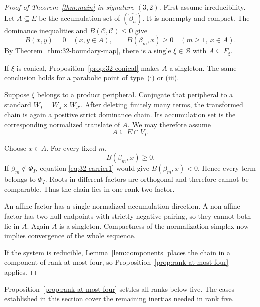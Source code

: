 \documentclass[11pt,reqno]{amsart}
\theoremstyle{plain}
\theoremstyle{definition}
\theoremstyle{remark}
\numberwithin{equation}{section}
\begin{document}
\begin{proof}[Proof of Theorem~\ref{thm:main} in signature $(3,2)$]
First assume irreducibility.
Let $A\subseteq E$ be the accumulation set of
$(\widehat{\beta_n})$.
It is nonempty and compact.
The dominance inequalities and
$B(\mathcal C,\mathcal C)\leq0$ give
\[
    B(x,y)=0\quad(x,y\in A),
    \qquad
    B(\beta_m,x)\geq0\quad(m\geq1,\ x\in A).
\]
By Theorem~\ref{thm:32-boundary-map},
there is a single $\xi\in\mathcal B$ with
$A\subseteq F_\xi$.

If $\xi$ is conical,
Proposition~\ref{prop:32-conical} makes $A$ a singleton.
The same conclusion holds for a parabolic point of
type~\textup{(i)} or \textup{(iii)}.

Suppose $\xi$ belongs to a product peripheral.
Conjugate that peripheral to a standard
$W_I=W_J\times W_{J'}$.
After deleting finitely many terms, the transformed
chain is again a positive strict dominance chain.
Its accumulation set is the corresponding normalized
translate of $A$.
We may therefore assume
\[
    A\subseteq E\cap V_I.
\]

Choose $x\in A$.
For every fixed $m$,
\[
    B(\beta_m,x)\geq0.
\]
If $\beta_m\notin\Phi_I$,
equation \eqref{eq:32-carrier1} would give
$B(\beta_m,x)<0$.
Hence every term belongs to $\Phi_I$.
Roots in different factors are orthogonal and therefore
cannot be comparable.
Thus the chain lies in one rank-two factor.

An affine factor has a single normalized accumulation
direction.
A non-affine factor has two null endpoints with strictly
negative pairing, so they cannot both lie in $A$.
Again $A$ is a singleton.
Compactness of the normalization simplex now implies
convergence of the whole sequence.

If the system is reducible, Lemma~\ref{lem:components} places the chain in a component of rank at most four, so Proposition~\ref{prop:rank-at-most-four} applies.
\end{proof}

Proposition~\ref{prop:rank-at-most-four} settles all ranks below five.
The cases established in this section cover the remaining inertias needed in rank five.



\end{document}
